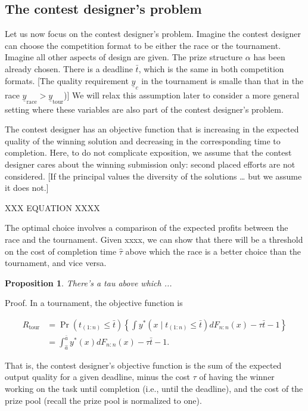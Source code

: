 \documentclass[12pt,]{article}
\theoremstyle{plain} %
\newtheorem{proposition}{Proposition}
\newcommand\deadline{\bar{t}}
\newcommand\target{\underline{y}}
\newcommand\race{\text{race}}
\newcommand\tournament{\text{tour}}
\newcommand\mtype{\hat{a}}
\newcommand\hitype{\bar{a}}
\begin{document}
\subsection{The contest designer's
problem}\label{the-contest-designers-problem}

Let us now focus on the contest designer's problem. Imagine the contest
designer can choose the competition format to be either the race or the
tournament. Imagine all other aspects of design are given. The prize
structure \(\alpha\) has been already chosen. There is a deadline
\(\deadline\), which is the same in both competition formats. {[}The
quality requirement \(\target_c\) in the tournament is smalle than that
in the race \(\target_\race > \target_\tournament\)){]} We will relax
this assumption later to consider a more general setting where these
variables are also part of the contest designer's problem.

The contest designer has an objective function that is increasing in the
expected quality of the winning solution and decreasing in the
corresponding time to completion. Here, to do not complicate exposition,
we assume that the contest designer cares about the winning submission
only: second placed efforts are not considered. {[}If the principal
values the diversity of the solutions \ldots{} but we assume it does
not.{]}

XXX EQUATION XXXX

The optimal choice involves a comparison of the expected profits between
the race and the tournament. Given xxxx, we can show that there will be
a threshold on the cost of completion time \(\hat\tau\) above which the
race is a better choice than the tournament, and vice versa.

\begin{proposition}
There's a tau above which ... 
\end{proposition}

Proof. In a tournament, the objective function is

\begin{align}
R_\tournament & = \Pr(t_{(1:n)}\leq \deadline) \left\{\int y^*(x \mid t_{(1:n)}\leq \deadline) dF_{n:n}(x) - \tau \deadline - 1 \right\}  \nonumber\\
  & = \int_{\mtype}^{\hitype} y^*(x) dF_{n:n}(x) - \tau \deadline - 1. 
\end{align}

That is, the contest designer's objective function is the sum of the
expected output quality for a given deadline, minus the cost \(\tau\) of
having the winner working on the task until completion (i.e., until the
deadline), and the cost of the prize pool (recall the prize pool is
normalized to one).
\end{document}

